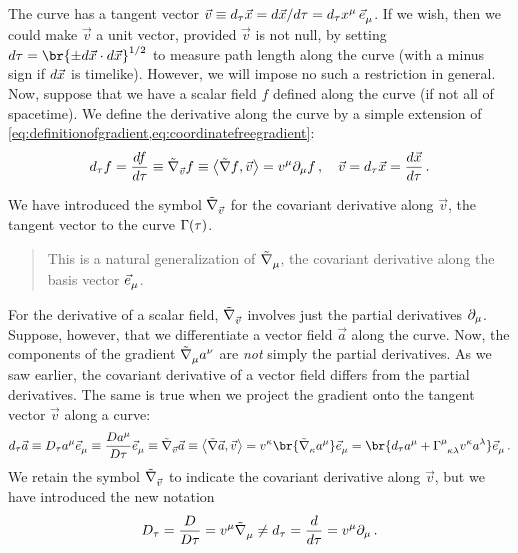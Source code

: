 The curve has a tangent vector $\vec v\defas d_\ptime\vec\pos = d\vec\pos/d\ptime = d_\ptime\tvec\pos\mu\,\tbvec\mu$. If we wish, then we could make $\vec v$ a unit vector, provided $\vec v$ is not null, by setting $d\ptime = \br{\pm d\vec\pos\iprod d\vec\pos}^{1/2}$ to measure path length along the curve (with a minus sign if $d\vec{x}$ is timelike). However, we will impose no such a restriction in general. Now, suppose that we have a scalar field $f$ defined along the curve (if not all of spacetime). We define the derivative along the curve by a simple extension of \cref{eq:definitionofgradient,eq:coordinatefreegradient}:
%
\begin{equation}\label{eq:derivativealongacurve}
  d_\ptime f = \dfrac{df}{d\ptime}
             \defas \cgradcov{\vec v} f
             \defas \sprod{\gradcov f}{\vec v}
             = \tvec v\mu\ipd\mu f\,,\quad
  \vec v = d_\ptime\vec\pos
         = \dfrac{d\vec\pos}{d\ptime}\,.
\end{equation}

 We have introduced the symbol $\cgradcov{\vec v}$ for the covariant derivative along $\vec v$, the tangent vector to the curve $\curve\vat\ptime$. 
%
\begin{quotation}
  This is a natural generalization of $\tgradcov\mu$, the covariant derivative along the basis vector $\tbvec\mu$.
\end{quotation}

For the derivative of a scalar field, $\cgradcov{\vec v}$ involves just the partial derivatives $\partial_{\mu}$. Suppose, however, that we differentiate a vector field $\vec a$ along the curve. Now, the components of the gradient $\tgradcov\mu\tvec a\nu$ are \emph{not} simply the partial derivatives. As we saw earlier, the covariant derivative of a vector field differs from the partial derivatives. The same is true when we project the gradient onto the tangent vector $\vec v$ along a curve:
%
\begin{equation}\label{eq:gradientprojectionalongacurve}
  d_\ptime\vec a \defas D_\ptime\tvec a\mu\tbvec\mu
                 \defas \dfrac{D\tvec a\mu}{D\ptime}\tbvec\mu
                 \defas \cgradcov{\vec v}\vec a
                 \defas \sprod{\gradcov\vec a}{\vec v}
                 = \tvec v\kappa\br{\tgradcov\kappa\tvec a\mu}\tbvec\mu
                 = \br{d_\ptime\tvec a\mu + \tchris\mu\kappa\lambda\tvec v\kappa\tvec a\lambda}\tbvec\mu\,.
\end{equation}
%
We retain the symbol $\cgradcov{\vec v}$ to indicate the covariant derivative along $\vec v$, but we have introduced the new notation
%
\begin{equation*}
  D_\ptime = \dfrac{D}{D\ptime} = \tvec v\mu\tgradcov\mu
           \neq d_\ptime = \dfrac{d}{d\ptime} = \tvec v\mu\ipd\mu\,.
\end{equation*}



